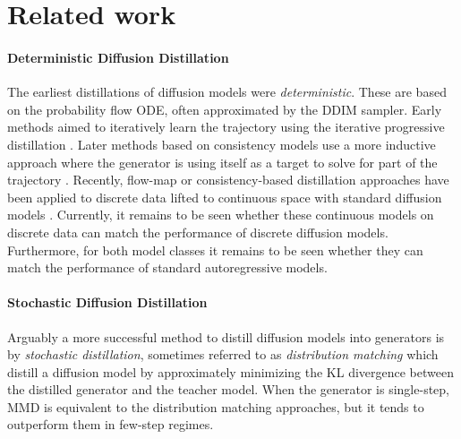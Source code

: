 \section{Related work}
\label{sec:related_work}


\paragraph{Deterministic Diffusion Distillation}
The earliest distillations of diffusion models were \textit{deterministic}. These are based on the probability flow ODE, often approximated by the DDIM sampler. Early methods aimed to iteratively learn the trajectory using the iterative progressive distillation \citep{salimans2022progressive,meng2022ondistillation}. Later methods based on consistency models \citep{song2023consistency} use a more inductive approach where the generator is using itself as a target to solve for part of the trajectory \citep{kim2023consistency,song2023improvedconsistency,heek2024multistep,lu2024simplifying}.
Recently, flow-map or consistency-based distillation approaches have been applied to discrete data lifted to continuous space with standard diffusion models \citep{sahoo2025diffusion,roos2026categorical,lee2026one}. Currently, it remains to be seen whether these continuous models on discrete data can match the performance of discrete diffusion models. Furthermore, for both model classes it remains to be seen whether they can match the performance of standard autoregressive models.

\paragraph{Stochastic Diffusion Distillation}
Arguably a more successful method to distill diffusion models into generators is by \textit{stochastic distillation}, sometimes referred to as \textit{distribution matching} \citep{wang2023prolificdreamer,luo2024diff,yin2024one} which distill a diffusion model by approximately minimizing the KL divergence between the distilled generator and the teacher model. When the generator is single-step, MMD \citep{salimans2024multistep} is equivalent to the distribution matching approaches, but it tends to outperform them in few-step regimes.

